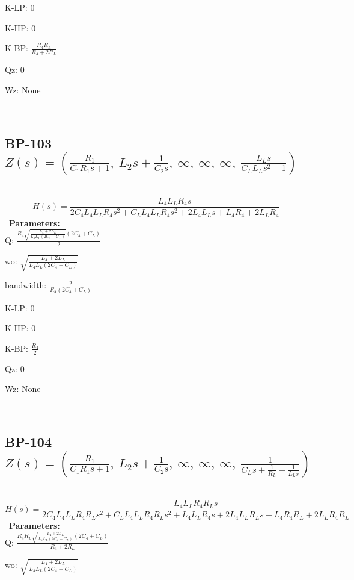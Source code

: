 \documentclass{article}
\begin{document}
K-LP: $0$\ 

K-HP: $0$\ 

K-BP: $\frac{R_{4} R_{L}}{R_{4} + 2 R_{L}}$\ 

Qz: $0$\ 

Wz: $\text{None}$\ 

\ 

\subsection{BP-103 $Z(s) = \left( \frac{R_{1}}{C_{1} R_{1} s + 1}, \  L_{2} s + \frac{1}{C_{2} s}, \  \infty, \  \infty, \  \infty, \  \frac{L_{L} s}{C_{L} L_{L} s^{2} + 1}\right)$ } \ 
\textbf{\[H(s) = \frac{L_{4} L_{L} R_{4} s}{2 C_{4} L_{4} L_{L} R_{4} s^{2} + C_{L} L_{4} L_{L} R_{4} s^{2} + 2 L_{4} L_{L} s + L_{4} R_{4} + 2 L_{L} R_{4}}\] } \ 
\textbf{Parameters:}\\ 

Q: $\frac{R_{4} \sqrt{\frac{L_{4} + 2 L_{L}}{L_{4} L_{L} \left(2 C_{4} + C_{L}\right)}} \left(2 C_{4} + C_{L}\right)}{2}$\ 

wo: $\sqrt{\frac{L_{4} + 2 L_{L}}{L_{4} L_{L} \left(2 C_{4} + C_{L}\right)}}$\ 

bandwidth: $\frac{2}{R_{4} \left(2 C_{4} + C_{L}\right)}$\ 

K-LP: $0$\ 

K-HP: $0$\ 

K-BP: $\frac{R_{4}}{2}$\ 

Qz: $0$\ 

Wz: $\text{None}$\ 

\ 

\subsection{BP-104 $Z(s) = \left( \frac{R_{1}}{C_{1} R_{1} s + 1}, \  L_{2} s + \frac{1}{C_{2} s}, \  \infty, \  \infty, \  \infty, \  \frac{1}{C_{L} s + \frac{1}{R_{L}} + \frac{1}{L_{L} s}}\right)$ } \ 
\textbf{\[H(s) = \frac{L_{4} L_{L} R_{4} R_{L} s}{2 C_{4} L_{4} L_{L} R_{4} R_{L} s^{2} + C_{L} L_{4} L_{L} R_{4} R_{L} s^{2} + L_{4} L_{L} R_{4} s + 2 L_{4} L_{L} R_{L} s + L_{4} R_{4} R_{L} + 2 L_{L} R_{4} R_{L}}\] } \ 
\textbf{Parameters:}\\ 

Q: $\frac{R_{4} R_{L} \sqrt{\frac{L_{4} + 2 L_{L}}{L_{4} L_{L} \left(2 C_{4} + C_{L}\right)}} \left(2 C_{4} + C_{L}\right)}{R_{4} + 2 R_{L}}$\ 

wo: $\sqrt{\frac{L_{4} + 2 L_{L}}{L_{4} L_{L} \left(2 C_{4} + C_{L}\right)}}$\ 
\end{document}
